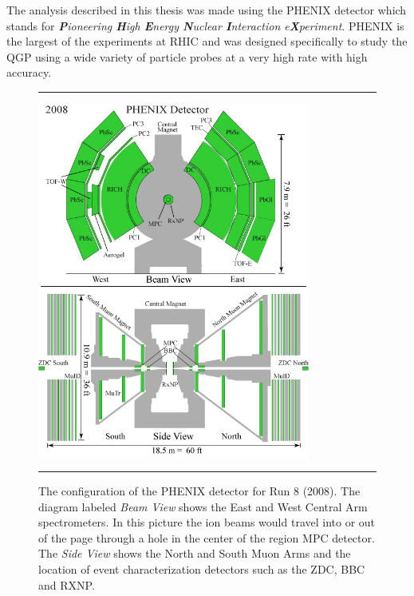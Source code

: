\indent The analysis described in this thesis was made using the PHENIX detector which stands for \textit{\textbf{P}ioneering \textbf{H}igh \textbf{E}nergy \textbf{N}uclear \textbf{I}nteraction e\textbf{X}periment}. PHENIX is the largest of the experiments at RHIC and was designed specifically to study the QGP using a wide variety of particle probes at a very high rate with high accuracy.  
\begin{figure}[htbp]
  \centering    \rule{35em}{0.5pt}
    \includegraphics[width=0.8\textwidth]{Figures/Phenix_2008.jpg}

  \caption[PHENIX Detector Configuration for RHIC Run 8 (2008)]{The configuration of the PHENIX detector for Run 8 (2008). The diagram labeled \textit{Beam View} shows the East and West Central Arm spectrometers. In this picture the ion beams would travel into or out of the page through a hole in the center of the region MPC detector. The \textit{Side View} shows the North and South Muon Arms and the location of event characterization detectors such as the ZDC, BBC and RXNP.}
    \rule{35em}{0.5pt}
  \label{fig:run8config}
\end{figure}
